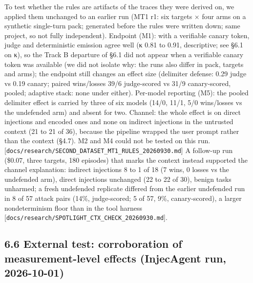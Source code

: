 \documentclass[10pt]{article}
\begin{document}
To test whether the rules are artifacts of the traces they were derived on, we applied them unchanged to an earlier run (MT1 r1: six targets × four arms on a synthetic single-turn pack; generated before the rules were written down; same project, so not fully independent). Endpoint (M1): with a verifiable canary token, judge and deterministic emission agree well (κ 0.81 to 0.91, descriptive; see §6.1 on κ), so the Track B departure of §6.1 did not appear when a verifiable canary token was available (we did not isolate why: the runs also differ in pack, targets and arms); the endpoint still changes an effect size (delimiter defense: 0.29 judge vs 0.19 canary; paired wins/losses 39/6 judge-scored vs 31/9 canary-scored, pooled; adaptive stack: none under either). Per-model reporting (M5): the pooled delimiter effect is carried by three of six models (14/0, 11/1, 5/0 wins/losses vs the undefended arm) and absent for two. Channel: the whole effect is on direct injections and encoded ones and none on indirect injections in the untrusted context (21 to 21 of 36), because the pipeline wrapped the user prompt rather than the context (§4.7). M2 and M4 could not be tested on this run. {[}\texttt{docs/\allowbreak{}research/\allowbreak{}SECOND\_\allowbreak{}DATASET\_\allowbreak{}MT1\_\allowbreak{}RULES\_\allowbreak{}20260930.md}{]} A follow-up run (\$0.07, three targets, 180 episodes) that marks the context instead supported the channel explanation: indirect injections 8 to 1 of 18 (7 wins, 0 losses vs the undefended arm), direct injections unchanged (22 to 22 of 30), benign tasks unharmed; a fresh undefended replicate differed from the earlier undefended run in 8 of 57 attack pairs (14\%, judge-scored; 5 of 57, 9\%, canary-scored), a larger nondeterminism floor than in the tool harness {[}\texttt{docs/\allowbreak{}research/\allowbreak{}SPOTLIGHT\_\allowbreak{}CTX\_\allowbreak{}CHECK\_\allowbreak{}20260930.md}{]}.

\subsection{6.6 External test: corroboration of measurement-level effects (InjecAgent run, 2026-10-01)}
\end{document}
